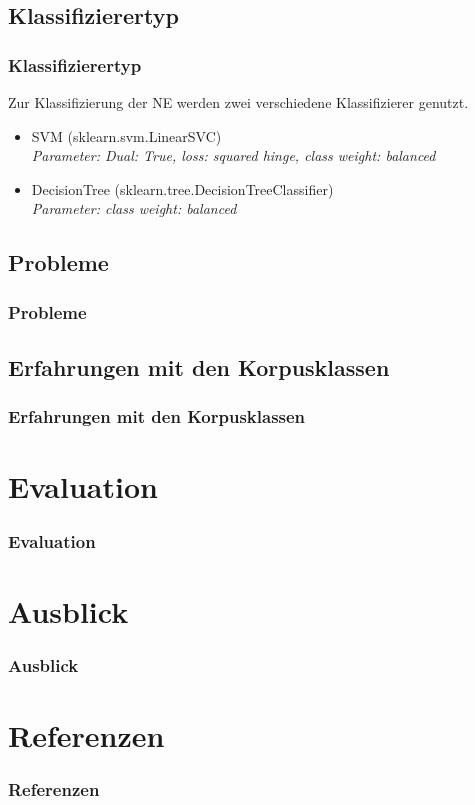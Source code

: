 \documentclass{beamer}
\begin{document}
	\subsection{Klassifizierertyp}
	\begin{frame}
		\frametitle{Klassifizierertyp}
		Zur Klassifizierung der NE werden zwei verschiedene Klassifizierer genutzt.\\
		
		\begin{itemize}
			\item SVM (sklearn.svm.LinearSVC)\\
				\em{Parameter: Dual: True, loss: squared hinge, class weight: balanced}
			\item DecisionTree (sklearn.tree.DecisionTreeClassifier)\\
			\em{Parameter: class weight: balanced}
		\end{itemize}
	\end{frame}
	\subsection{Probleme}
	\begin{frame}
		\frametitle{Probleme}
		
	\end{frame}
	\subsection{Erfahrungen mit den Korpusklassen}
	\begin{frame}
		\frametitle{Erfahrungen mit den Korpusklassen}
		
	\end{frame}
\section{Evaluation}
	\begin{frame}
		\frametitle{Evaluation}
		
	\end{frame}
\section{Ausblick}
	\begin{frame}
		\frametitle{Ausblick}
		
	\end{frame}
\section{Referenzen}
	\begin{frame}
		\frametitle{Referenzen}
		
		\end{frame}
\end{document}
